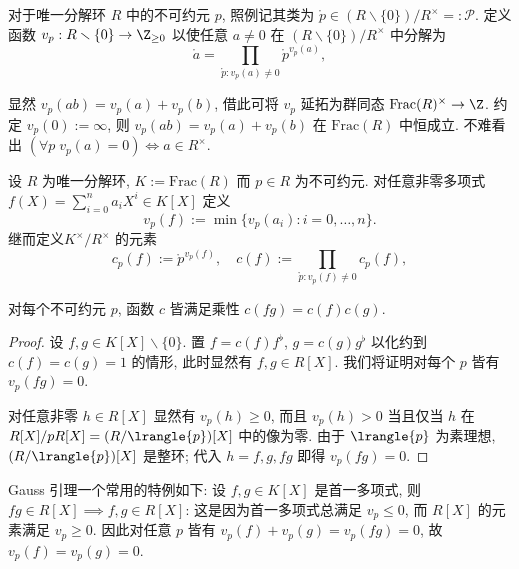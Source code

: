 对于唯一分解环 $R$ 中的不可约元 $p$, 照例记其类为 $\mathring{p} \in (R \smallsetminus \{0\})/R^\times =: \mathcal{P}$. 定义函数 $v_p: R \smallsetminus \{0\} \to \Z_{\geq 0}$ 以使任意 $a \neq 0$ 在 $(R \smallsetminus \{0\})/R^\times$ 中分解为
\[ \mathring{a} = \prod_{\mathring{p}: v_p(a) \neq 0} \mathring{p}^{v_p(a)}, \]

显然 $v_p(ab) = v_p(a) + v_p(b)$, 借此可将 $v_p$ 延拓为群同态 $\text{Frac}(R)^\times \to \Z$. 约定 $v_p(0) := \infty$, 则 $v_p(ab) = v_p(a)+v_p(b)$ 在 $\text{Frac}(R)$ 中恒成立. 不难看出 $(\forall p \; v_p(a) = 0) \iff a \in R^\times$.

\begin{definition} %
	设 $R$ 为唯一分解环, $K := \mathrm{Frac}(R)$ 而 $p \in R$ 为不可约元. 对任意非零多项式 $f(X) = \sum_{i=0}^n a_i X^i \in K[X]$ 定义
	\[ v_p(f) :=  \min\{ v_p(a_i) : i = 0, \ldots, n\}. \] 
	继而定义$K^\times/R^\times$ 的元素
	\[ c_p(f) := \mathring{p}^{v_p(f)}, \quad c(f) := \prod_{\mathring{p}: v_p(f) \neq 0} c_p(f), \] 
\end{definition}

\begin{lemma}[C.\ F.\ Gauss]\label{prop:Gauss-lemma}
	对每个不可约元 $p$, 函数 $c$ 皆满足乘性 $c(fg) = c(f)c(g)$.
\end{lemma}
\begin{proof}
	设 $f,g \in K[X] \smallsetminus \{0\}$. 置 $f = c(f) f^\flat$, $g = c(g) g^\flat$ 以化约到 $c(f) = c(g) = 1$ 的情形, 此时显然有 $f,g \in R[X]$. 我们将证明对每个 $p$ 皆有 $v_p(fg) = 0$.

	对任意非零 $h \in R[X]$ 显然有 $v_p(h) \geq 0$, 而且 $v_p(h) > 0$ 当且仅当 $h$ 在 $R[X]/pR[X] = (R/\lrangle{p})[X]$ 中的像为零. 由于 $\lrangle{p}$ 为素理想, $(R/\lrangle{p})[X]$ 是整环; 代入 $h=f,g,fg$ 即得 $v_p(fg)=0$.
\end{proof}

\begin{remark}\label{rem:Gauss-lemma-monic}
	Gauss 引理一个常用的特例如下: 设 $f,g \in K[X]$ 是首一多项式, 则 $fg \in R[X] \implies f,g \in R[X]$: 这是因为首一多项式总满足 $v_p \leq 0$, 而 $R[X]$ 的元素满足 $v_p \geq 0$. 因此对任意 $p$ 皆有 $v_p(f) + v_p(g) = v_p(fg) = 0$, 故 $v_p(f)=v_p(g)=0$.
\end{remark}

